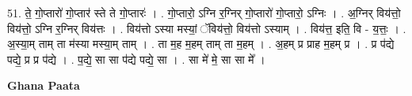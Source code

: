 \documentclass[17pt]{extarticle}
\begin{document}
51. ते॒ गो॒प्तारो॑ गो॒प्तार॑ स्ते ते गो॒प्तारः॑ । . गो॒प्तारो॒ ऽग्नि र॒ग्निर् गो॒प्तारो॑ गो॒प्तारो॒ ऽग्निः । . अ॒ग्निर् विय॑त्तो॒ विय॑त्तो॒ ऽग्नि र॒ग्निर् विय॑त्तः । . विय॑त्तो ऽस्या मस्यां॒ ॅविय॑त्तो॒ विय॑त्तो ऽस्याम् । . विय॑त्त॒ इति॒ वि - य॒त्तः॒ । . अ॒स्या॒म् ताम् ता म॑स्या मस्या॒म् ताम् । . ता म॒ह म॒हम् ताम् ता म॒हम् । . अ॒हम् प्र प्राह म॒हम् प्र । . प्र प॑द्ये पद्ये॒ प्र प्र प॑द्ये । . प॒द्ये॒ सा सा प॑द्ये पद्ये॒ सा । . सा मे॑ मे॒ सा सा मे᳚ । \newline

\textbf{Ghana Paata } \newline
\end{document}
